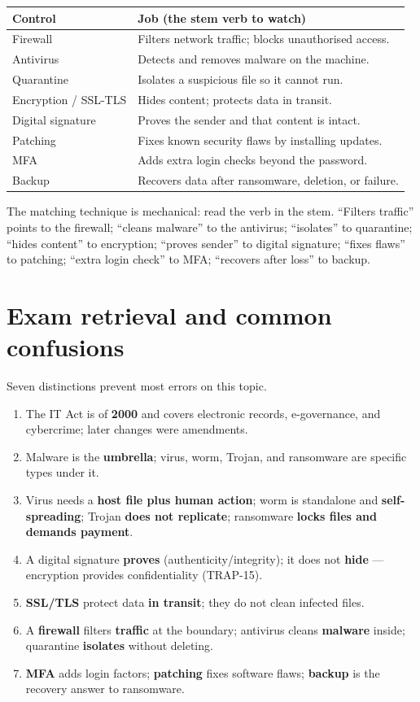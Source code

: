 \begin{center}
\begin{tabular}{p{}p{}}
\toprule
\textbf{Control} & \textbf{Job (the stem verb to watch)} \\
\midrule
Firewall & Filters network traffic; blocks unauthorised access. \\
Antivirus & Detects and removes malware on the machine. \\
Quarantine & Isolates a suspicious file so it cannot run. \\
Encryption / SSL-TLS & Hides content; protects data in transit. \\
Digital signature & Proves the sender and that content is intact. \\
Patching & Fixes known security flaws by installing updates. \\
MFA & Adds extra login checks beyond the password. \\
Backup & Recovers data after ransomware, deletion, or failure. \\
\bottomrule
\end{tabular}
\end{center}

The matching technique is mechanical: read the verb in the stem.
``Filters traffic'' points to the firewall; ``cleans malware'' to the
antivirus; ``isolates'' to quarantine; ``hides content'' to encryption;
``proves sender'' to digital signature; ``fixes flaws'' to patching;
``extra login check'' to MFA; ``recovers after loss'' to backup.

\section{Exam retrieval and common confusions}
Seven distinctions prevent most errors on this topic.
\begin{enumerate}
  \item The IT Act is of \textbf{2000} and covers electronic records,
    e-governance, and cybercrime; later changes were amendments.
  \item Malware is the \textbf{umbrella}; virus, worm, Trojan, and
    ransomware are specific types under it.
  \item Virus needs a \textbf{host file plus human action}; worm is
    standalone and \textbf{self-spreading}; Trojan \textbf{does not
    replicate}; ransomware \textbf{locks files and demands payment}.
  \item A digital signature \textbf{proves} (authenticity/integrity); it
    does not \textbf{hide} --- encryption provides confidentiality
    (TRAP-15).
  \item \textbf{SSL/TLS} protect data \textbf{in transit}; they do not
    clean infected files.
  \item A \textbf{firewall} filters \textbf{traffic} at the boundary;
    antivirus cleans \textbf{malware} inside; quarantine
    \textbf{isolates} without deleting.
  \item \textbf{MFA} adds login factors; \textbf{patching} fixes software
    flaws; \textbf{backup} is the recovery answer to ransomware.
\end{enumerate}

